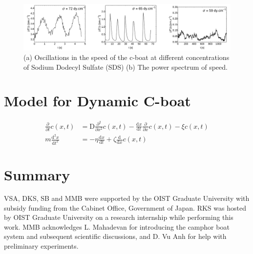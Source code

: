 \documentclass[aps, twocolumn, floatfix, superscriptaddress]{revtex4}
\newcommand{\tdc}[3][]{\frac{\mathrm{d}^{#1}#2}{\mathrm{d}#3^{#1}}} %
\newcommand{\pdc}[3][]{\frac{\partial^{#1} #2}{\partial #3^{#1}}} %
\begin{document}
\begin{figure}[ht]
    \begin{center}
       \includegraphics[scale=0.1]{figure8.pdf}
    \end{center}
    \caption{(a) Oscillations in the speed of the c-boat at different concentrations of Sodium Dodecyl Sulfate (SDS) (b) The power spectrum of speed.}
    \label{fig:absvsds}
\end{figure}
\section{Model for Dynamic C-boat}
\begin{align}
\pdc{}{t}c(x, t) &= \mathrm{D} \pdc[2]{}{x}c(x, t) - \tdc{x}{t} \pdc{}{x}c(x, t)  - \xi c(x, t) \\
m\tdc[2]{x}{t} &= -\eta \tdc{x}{t} + \zeta \tdc{}{x}c(x,t) 
\end{align}
\section{Summary}
\label{sec:summary}


\acknowledgments
VSA, DKS, SB and MMB were supported by the OIST Graduate University with subsidy funding from the Cabinet Office, Government of Japan. RKS was hosted by OIST Graduate University on a research internship while performing this work. MMB acknowledges L. Mahadevan for introducing the camphor boat system and subsequent scientific discussions, and D. Vu Anh for help with preliminary experiments.


\end{document}

